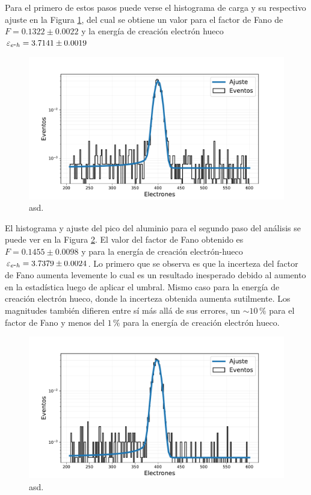 Para el primero de estos pasos puede verse el histograma de carga y su respectivo ajuste en la Figura \ref{fig:Al_OHDU1_EPIX05}, del cual se obtiene un valor para el factor de Fano de $F = 0.1322 \pm 0.0022$ y la energía de creación electrón hueco $\varepsilon_{e\mbox{-}h} = 3.7141 \pm 0.0019$
\begin{figure}[H]
    \centering
        \includegraphics[scale=0.5]{Figs/HistFit_EPIX05_OHDU1_SinCorr.pdf}
    \caption{\footnotesize{asd.}}
    \label{fig:Al_OHDU1_EPIX05}
\end{figure}

El histograma y ajuste del pico del aluminio para el segundo paso del análisis se puede ver en la Figura \ref{fig:Al_OHDU1_EPIX15_SinCorr}. El valor del factor de Fano obtenido es $F = 0.1455 \pm 0.0098$ y para la energía de creación electrón-hueco $\varepsilon_{e\mbox{-}h} = 3.7379 \pm 0.0024$. Lo primero que se observa es que la incerteza del factor de Fano aumenta levemente lo cual es un resultado inesperado debido al aumento en la estadística luego de aplicar el umbral. Mismo caso para la energía de creación electrón hueco, donde la incerteza obtenida aumenta sutilmente. Los magnitudes también difieren entre sí más allá de sus errores, un $\sim 10\,\%$ para el factor de Fano y menos del $1\,\%$ para la energía de creación electrón hueco.
\begin{figure}[H]
    \centering
        \includegraphics[scale=0.5]{Figs/HistFit_100c_EPIX15_OHDU1_SinCorr.pdf}
    \caption{\footnotesize{asd.}}
    \label{fig:Al_OHDU1_EPIX15_SinCorr}
\end{figure}

